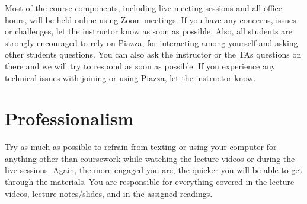 \documentclass[11pt, a4paper]{article}
\begin{document}
Most of the course components, including live meeting sessions and all office hours, will be held online using Zoom meetings. If you have any concerns, issues or challenges, let the instructor know as soon as possible. Also, all students are strongly encouraged to rely on Piazza, for interacting among yourself and asking other students questions. You can also ask the instructor or the TAs questions on there and we will try to respond as soon as possible.  If you experience any technical issues with joining or using Piazza, let the instructor know.


\section{Professionalism}
Try as much as possible to refrain from texting or using your computer for anything other than coursework while watching the lecture videos or during the live sessions. Again, the more engaged you are, the quicker you will be able to get through the materials. You are responsible for everything covered in the lecture videos, lecture notes/slides, and in the assigned readings.
\end{document}
